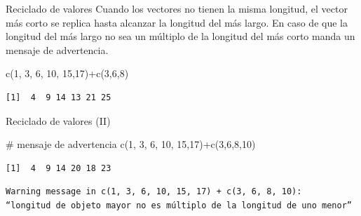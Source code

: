 \documentclass[
  ignorenonframetext,
  aspectratio=169,
  spanish,
]{beamer}
\newenvironment{Shaded}{\begin{snugshade}}{\end{snugshade}}
\newcommand{\CommentTok}[1]{\textcolor[rgb]{0.37,0.37,0.37}{#1}}
\newcommand{\DecValTok}[1]{\textcolor[rgb]{0.68,0.00,0.00}{#1}}
\newcommand{\FunctionTok}[1]{\textcolor[rgb]{0.28,0.35,0.67}{#1}}
\newcommand{\NormalTok}[1]{\textcolor[rgb]{0.00,0.23,0.31}{#1}}
\newcommand{\SpecialCharTok}[1]{\textcolor[rgb]{0.37,0.37,0.37}{#1}}
\begin{document}
\begin{frame}[fragile]{Reciclado de valores}
\label{reciclado-de-valores}
Cuando los vectores no tienen la misma longitud, el vector más corto se
replica hasta alcanzar la longitud del más largo. En caso de que la
longitud del más largo no sea un múltiplo de la longitud del más corto
manda un mensaje de advertencia.

\begin{Shaded}
\begin{Highlighting}[]
\FunctionTok{c}\NormalTok{(}\DecValTok{1}\NormalTok{, }\DecValTok{3}\NormalTok{, }\DecValTok{6}\NormalTok{, }\DecValTok{10}\NormalTok{, }\DecValTok{15}\NormalTok{,}\DecValTok{17}\NormalTok{)}\SpecialCharTok{+}\FunctionTok{c}\NormalTok{(}\DecValTok{3}\NormalTok{,}\DecValTok{6}\NormalTok{,}\DecValTok{8}\NormalTok{)}
\end{Highlighting}
\end{Shaded}

\begin{verbatim}
[1]  4  9 14 13 21 25
\end{verbatim}
\end{frame}

\begin{frame}[fragile]{Reciclado de valores (II)}
\label{reciclado-de-valores-ii}
\begin{Shaded}
\begin{Highlighting}[]
\CommentTok{\# mensaje de advertencia }
\FunctionTok{c}\NormalTok{(}\DecValTok{1}\NormalTok{, }\DecValTok{3}\NormalTok{, }\DecValTok{6}\NormalTok{, }\DecValTok{10}\NormalTok{, }\DecValTok{15}\NormalTok{,}\DecValTok{17}\NormalTok{)}\SpecialCharTok{+}\FunctionTok{c}\NormalTok{(}\DecValTok{3}\NormalTok{,}\DecValTok{6}\NormalTok{,}\DecValTok{8}\NormalTok{,}\DecValTok{10}\NormalTok{)  }
\end{Highlighting}
\end{Shaded}

\begin{verbatim}
[1]  4  9 14 20 18 23
\end{verbatim}

\begin{verbatim}
Warning message in c(1, 3, 6, 10, 15, 17) + c(3, 6, 8, 10):
“longitud de objeto mayor no es múltiplo de la longitud de uno menor”
\end{verbatim}
\end{frame}
\end{document}
